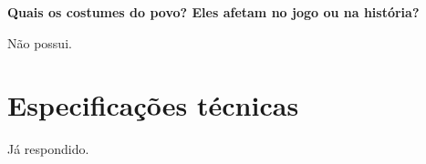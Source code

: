 \documentclass[]{scrartcl}
\begin{document}
\noindent\textbf{Quais os costumes do povo? Eles afetam no jogo ou na
história?}

Não possui.

\section{Especificações técnicas}

Já respondido.



%
%
%
%

		
\end{document}
